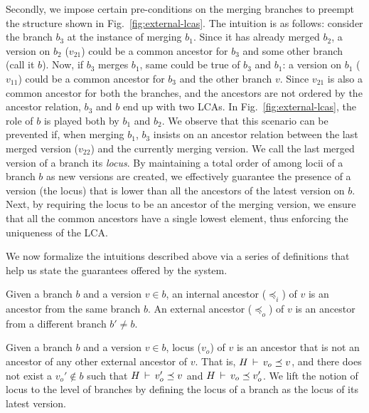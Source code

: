 Secondly, we impose certain pre-conditions on the merging branches to
preempt the structure shown in Fig.~\ref{fig:external-lcas}. The
intuition is as follows: consider the branch $b_3$ at the instance of
merging $b_1$. Since it has already merged $b_2$, a version on $b_2$
($v_{21}$) could be a common ancestor for $b_3$ and some other branch
(call it $b$). Now, if $b_3$ merges $b_1$, same could be true of $b_3$
and $b_1$: a version on $b_1$ ($v_{11}$) could be a common ancestor
for $b_3$ and the other branch $v$. Since $v_{21}$ is also a common
ancestor for both the branches, and the ancestors are not ordered by
the ancestor relation, $b_3$ and $b$ end up with two LCAs. In
Fig.~\ref{fig:external-lcas}, the role of $b$ is played both by $b_1$
and $b_2$. We observe that this scenario can be prevented if, when
merging $b_1$, $b_3$ insists on an ancestor relation between the last
merged version ($v_{22}$) and the currently merging version.  We call
the last merged version of a branch its \emph{locus}. By maintaining a
total order of among locii of a branch $b$ as new versions are
created, we effectively guarantee the presence of a version (the
locus) that is lower than all the ancestors of the latest version on
$b$. Next, by requiring the locus to be an ancestor of the merging
version, we ensure that all the common ancestors have a single lowest
element, thus enforcing the uniqueness of the LCA.

We now formalize the intuitions described above via a series of
definitions that help us state the guarantees offered by the system.

\begin{definition} 
Given a branch $b$ and a version $v\in b$, an internal ancestor
($\preceq_i$) of $v$ is an ancestor from the same branch $b$. An
external ancestor ($\preceq_o$) of $v$ is an ancestor from a different
branch $b'\neq b$. 
\end{definition}

\begin{definition} 
Given a branch $b$ and a version $v\in b$, locus ($v_o$) of $v$ is an
ancestor that is not an ancestor of any other external ancestor of
$v$. That is, $H\,\vdash\,v_o \preceq v$, and there does not exist a
$v_o' \not\in b$ such that $H\,\vdash\,v_o' \preceq v$ and
$H\,\vdash\,v_o \preceq v_o'$. We lift the notion of locus to the
level of branches by defining the locus of a branch as the locus of
its latest version.
\end{definition}

